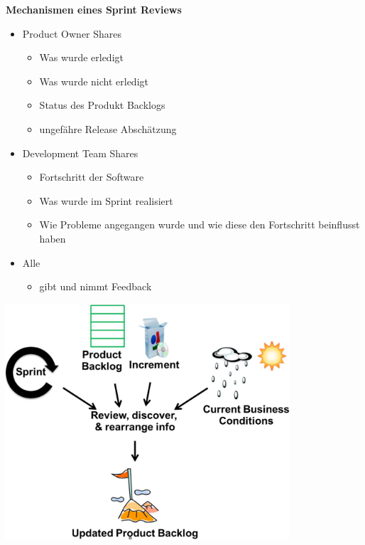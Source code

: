 \documentclass{report}
\newenvironment{Figure}
	{\par\medskip\noindent\minipage{\linewidth}}
	{\endminipage\par\medskip}
\theoremstyle{definition}
\theoremstyle{example}
\begin{document}
\textbf{Mechanismen eines Sprint Reviews}
\begin{itemize}
	\item { Product Owner Shares
			\begin{itemize}
				\item Was wurde erledigt
				\item Was wurde nicht erledigt
				\item Status des Produkt Backlogs
				\item ungefähre Release Abschätzung
			\end{itemize}
	}
	\item { Development Team Shares
			\begin{itemize}
				\item Fortschritt der Software
				\item Was wurde im Sprint realisiert
				\item Wie Probleme angegangen wurde und wie diese den Fortschritt beinflusst haben
			\end{itemize}
	}
	\item { Alle
			\begin{itemize}
				\item gibt und nimmt Feedback
			\end{itemize}
	}
\end{itemize}
\begin{Figure}
\centering
\includegraphics[width=400px]{img/InformationsflussReviewMeeting.png}
	\label{fig:Informationsfluss eines Review Meetings}
\end{Figure}
\end{document}
